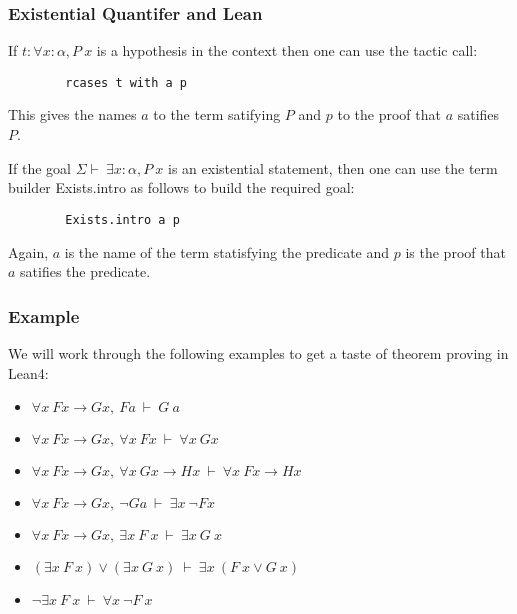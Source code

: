 \documentclass{beamer}
\theoremstyle{indentDefn} \newtheorem{defn}[]{Definition}
\begin{document}
\begin{frame}[fragile]
	\frametitle{Existential Quantifer and Lean}
	
	If $t : \forall x: \alpha, P \ x$ is a hypothesis in the context then one can use the tactic call: 
		
	\begin{lstlisting}	
		rcases t with a p
	\end{lstlisting}
	
	This gives the names $a$ to the term satifying $P$ and $p$ to the proof that $a$ satifies $P$.
	
	If the goal $\Sigma \vdash \ \exists x : \alpha, P \ x$ is an existential statement, then one can use the term builder Exists.intro as follows to build the required goal:
	
	\begin{lstlisting}
		Exists.intro a p	
	\end{lstlisting}
	
	Again, $a$ is the name of the term statisfying the predicate and $p$ is the proof that $a$ satifies the predicate.
	
\end{frame}

\begin{frame}
\frametitle{Example}
We will work through the following examples to get a taste of theorem proving in Lean4:

\begin{itemize}
	\item[] $\forall x \ Fx \to Gx, \ F a \ \vdash \ G \ a$
	\item[] $\forall x \ Fx \to Gx, \ \forall x \ Fx \ \vdash \ \forall x \ Gx$
	\item[] $\forall x \ Fx \to Gx, \ \forall x \ Gx \to Hx \ \vdash \ \forall x \ Fx \to Hx$ 
	\item[] $\forall x \ Fx \to Gx, \ \lnot G a \ \vdash \ \exists x \ \lnot F x$
	\item[] $\forall x \ Fx \to Gx, \ \exists x \ F \ x \ \vdash \ \exists x \ G \ x$
	\item[] $(\exists x \ F \ x) \lor (\exists x \ G \ x) \ \vdash \ \exists x \ (F \ x \lor G \ x)$
	\item[] $\lnot \exists x \ F \ x \ \vdash \ \forall x \ \lnot F \ x$
\end{itemize}
\end{frame}
\end{document}
